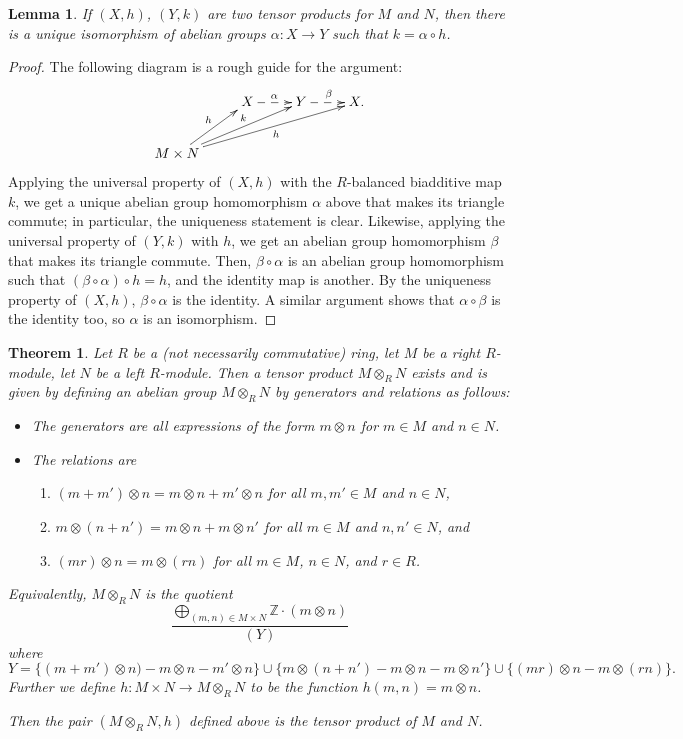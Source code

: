 \documentclass{amsart}[12pt]
\newcommand{\Z}{\mathbb{Z}}
\numberwithin{equation}{section}
\theoremstyle{plain} %
\newtheorem{thm}[equation]{Theorem}
\newtheorem{lem}[equation]{Lemma}
\theoremstyle{definition}
\theoremstyle{remark}
\begin{document}
\begin{lem} 
If $(X,h)$, $(Y,k)$ are two tensor products for $M$ and $N$, then there is a unique isomorphism of abelian groups $\alpha:X\to Y$ such that $k= \alpha\circ h$.
\end{lem}
\begin{proof}
The following diagram is a rough guide for the argument:
\[ \xymatrix{ & X \ar@{-->}[r]^{\alpha} & Y\ar@{-->}[r]^{\beta } & X . \\ M\times N \ar[ur]^-{h} \ar[urr]^-{k} \ar[urrr]_-{h} }\]
Applying the universal property of $(X,h)$ with the $R$-balanced biadditive map $k$, we get a unique abelian group homomorphism $\alpha$ above that makes its triangle commute; in particular, the uniqueness statement is clear. Likewise, applying the universal property of $(Y,k)$ with $h$, we get an abelian group homomorphism $\beta$ that makes its triangle commute. Then, $\beta\circ\alpha$ is an abelian group homomorphism such that $(\beta\circ\alpha) \circ h = h$, and the identity map is another. By the uniqueness property of $(X,h)$, $\beta\circ \alpha$ is the identity. A similar argument shows that $\alpha \circ \beta$ is the identity too, so $\alpha$ is an isomorphism.
\end{proof}

\begin{thm}
\label{thm:tensor}
Let $R$ be a (not necessarily commutative) ring, let $M$ be a right $R$-module, let $N$ be a left $R$-module.  Then a tensor product $M\otimes_R N$ exists and is given by defining an abelian group $M \otimes_R N$ by generators and relations as follows:
\begin{itemize}
\item The generators are all expressions of the form $m \otimes n$ for $m \in M$ and $n \in N$. 
\item The relations are
\begin{enumerate}
\item  $(m + m') \otimes n = m \otimes n + m' \otimes n$ for all $m, m' \in M$ and $n \in N$,
\item $m \otimes (n + n') = m \otimes n + m \otimes n'$ for all $m \in M$ and $n, n' \in N$, and
\item $(mr) \otimes n = m \otimes (rn)$ for all $m \in M$, $n\in N$, and $r \in R$.
\end{enumerate}
\end{itemize}
Equivalently, $M \otimes_R N$ is the quotient 
$$
\frac{\bigoplus_{(m,n) \in M \times N} \Z \cdot (m \otimes n)}{(Y)}
$$
where 
$$
Y =  \{(m + m') \otimes  n) -m \otimes n - m' \otimes n \} \cup
\{m \otimes  (n +n') - m \otimes n - m \otimes n'\} \cup
\{(mr) \otimes  n  - m \otimes (rn)\} .
$$
Further we define $h: M \times N \to M \otimes_R N$ to be the function $h(m,n)=m \otimes n$. 

Then the pair $(M \otimes_R N,h)$ defined above is the tensor product of $M$ and $N$.
\end{thm}
\end{document}
